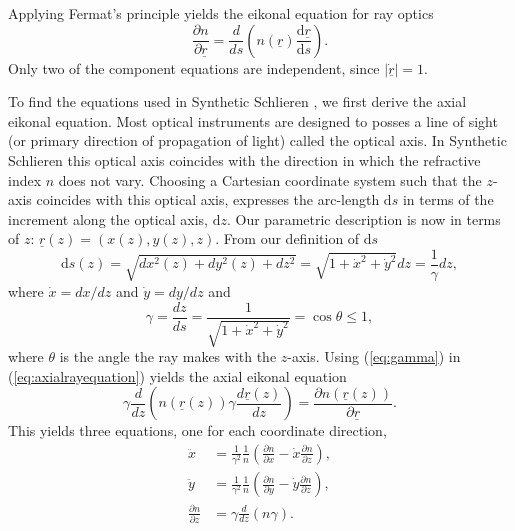 \documentclass[smallextended]{svjour3}       %
\begin{document}
Applying Fermat's principle \cite{holm2011geometric} yields the eikonal equation for ray optics
\begin{equation}
	\label{eq:axialrayequation}
	\frac{\partial n}{\partial \underline{r}} = \frac{d}{ds} \left(n(\underline{r}) \frac{\mathrm{d}\underline{r}}{\mathrm{d} s} \right).
\end{equation}
Only two of the component equations are independent, since $|\dot{\underline{r}}| = 1$.
 
To find the equations used in Synthetic Schlieren \cite{weyl1954analysis,dalziel2000whole}, we first derive the axial eikonal equation. Most optical instruments are designed to posses a line of sight (or primary direction of propagation of light) called the optical axis. In Synthetic Schlieren this optical axis coincides with the direction in which the refractive index $n$ does not vary. Choosing a Cartesian coordinate system such that the $z$-axis coincides with this optical axis, expresses the arc-length $\mathrm{d}s$ in terms of the increment along the optical axis, $\mathrm{d}z$. Our parametric description is now in terms of $z$: $\underline{r}(z) = (x(z), y(z), z)$. From our definition of $\mathrm{d}s$
\begin{equation}
	\mathrm{d}s(z) = \sqrt{dx^2(z) + dy^2(z) + dz^2} = \sqrt{1+\dot{x}^2 +\dot{y}^2} d z = \frac{1}{\gamma} d z,
\end{equation}
where $\dot{x} = d x / dz$ and $\dot{y} = dy/dz$ and 
\begin{equation}
	\label{eq:gamma}
	\gamma = \frac{d z}{d s} = \frac{1}{\sqrt{1+\dot{x}^2+\dot{y}^2}} = \cos \theta\leq 1,
\end{equation}
where $\theta$ is the angle the ray makes with the $z$-axis. Using (\ref{eq:gamma}) in (\ref{eq:axialrayequation}) yields the axial eikonal equation %
\begin{equation}
	\gamma \frac{d}{dz} \left(n(\underline{r}(z)) \gamma \frac{d \underline{r}(z)}{d z} \right)  = \frac{\partial n(\underline{r}(z))}{\partial \underline{r}}.
\end{equation}
This yields three equations, one for each coordinate direction,
\begin{equation}
	\label{eq:axraycoord}
	\begin{aligned}
		\ddot{x}  &= \frac{1}{\gamma^2} \frac{1}{n} \left(\frac{\partial n}{\partial x} - \dot{x} \frac{\partial n}{\partial z} \right), \\
		\ddot{y} &= \frac{1}{\gamma^2} \frac{1}{n} \left(\frac{\partial n}{\partial y} - \dot{y} \frac{\partial n}{\partial z} \right), \\
		\frac{\partial n}{\partial z} &= \gamma \frac{d}{dz}\left(n  \gamma\right).
	\end{aligned}
\end{equation}	
\end{document}
